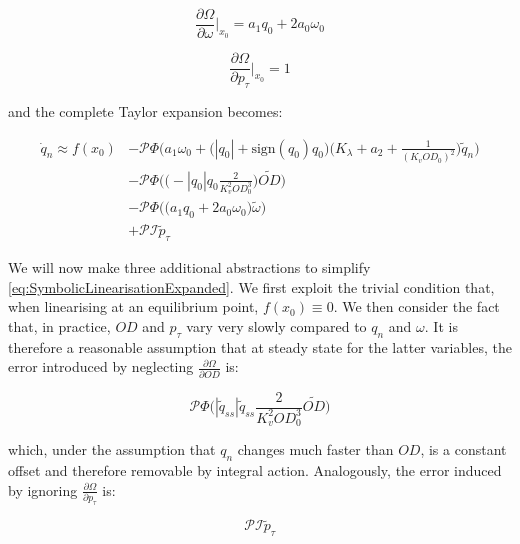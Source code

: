 \begin{equation}\label{eq:PartialTaylorOmega}
	\frac{\partial \Omega}{\partial \omega}\bigg\rvert_{x_0} 
	=
	a_1 q_0 + 2a_0\omega_0
\end{equation}

\begin{equation}\label{eq:PartialTaylorPressure}
		\frac{\partial \Omega}{\partial p_\tau}\bigg\rvert_{x_0} 
	=
	1
\end{equation}

and the complete Taylor expansion becomes:

\begin{equation}\label{eq:SymbolicLinearisationExpanded}
	\begin{split}
			\dot{q}_n \approx f(x_0) &-\mathcal{P}\Phi\Bigg(a_1\omega_0 + \Big(|q_0|+\text{sign}(q_0)q_0\Big)\Bigg(K_\lambda + a_2 + \frac{1}{(K_v OD_0)^2}\Bigg) \tilde{q}_n \Bigg)  \\
			&- \mathcal{P}\Phi\Bigg(\Big(-|q_0|q_0 \frac{2}{K_v^2 OD_0^3}\Big) \tilde{OD}\Bigg) \\
			&-  \mathcal{P}\Phi\Bigg(\Big(a_1 q_0 + 2a_0\omega_0\Big) \tilde{\omega}\Bigg) \\
			&+ \mathcal{P} \mathcal{I} \tilde{p}_\tau
	\end{split}
\end{equation}

We will now make three additional abstractions to simplify \cref{eq:SymbolicLinearisationExpanded}. We first exploit the trivial condition that, when linearising at an equilibrium point, $f(x_0) \equiv 0$. We then consider the fact that, in practice, $OD$ and $p_\tau$ vary very slowly compared to $q_n$ and $\omega$. It is therefore a reasonable assumption that at steady state for the latter variables, the error introduced by neglecting $\frac{\partial\Omega}{\partial OD}$ is:

\begin{equation}\label{eq:IgnoreODError}
	\mathcal{P}\Phi\Big(|\tilde{q}_{ss}|\tilde{q}_{ss}\frac{2}{K_v^2 OD_0^3} \tilde{OD}\Big)
\end{equation}

which, under the assumption that $q_n$ changes much faster than $OD$, is a constant offset and therefore removable by integral action. Analogously, the error induced by ignoring $\frac{\partial\Omega}{\partial p_\tau}$ is: 

\begin{equation}\label{eq:IgnorePressureError}
	\mathcal{P}\mathcal{I}\tilde{p}_\tau
\end{equation}

